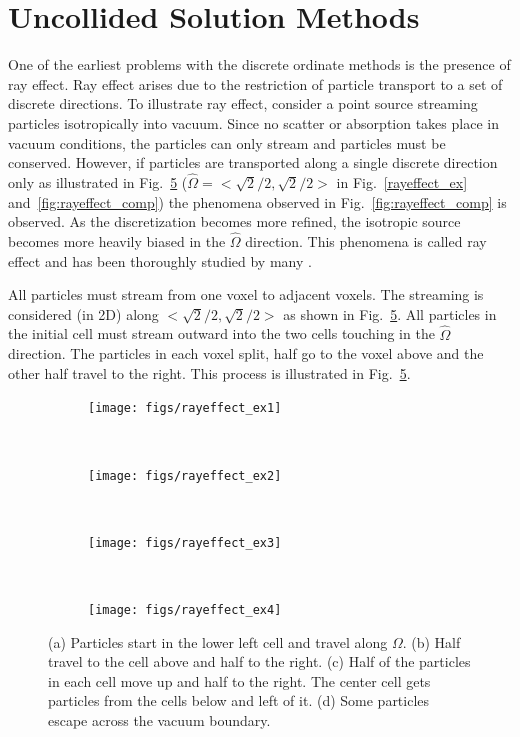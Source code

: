 \section{Uncollided Solution Methods}\label{sec:uncol}
One of the earliest problems with the discrete ordinate methods is the presence of ray effect. Ray effect arises due to the restriction of particle transport to a set of discrete directions. To illustrate ray effect, consider a point source streaming particles isotropically into vacuum. Since no scatter or absorption takes place in vacuum conditions, the particles can only stream and particles must be conserved. However, if particles are transported along a single discrete direction only as illustrated in Fig.~\ref{fig:rayeffect_ex} ($\hat{\Omega} = <\sqrt{2}/2, \sqrt{2}/2>$ in Fig.~\ref{rayeffect_ex} and~\ref{fig:rayeffect_comp}) the phenomena observed in Fig.~\ref{fig:rayeffect_comp} is observed. As the discretization becomes more refined, the isotropic source becomes more heavily biased in the $\hat{\Omega}$ direction. This phenomena is called ray effect and has been thoroughly studied by many \citep{ref:mathewsk} \citep{ref:tencerj}.

All particles must stream from one voxel to adjacent voxels. The streaming is considered (in 2D) along $<\sqrt{2}/2, \sqrt{2}/2>$ as shown in Fig.~\ref{fig:rayeffect_ex}. All particles in the initial cell must stream outward into the two cells touching in the $\hat{\Omega}$ direction. The particles in each voxel split, half go to the voxel above and the other half travel to the right. This process is illustrated in Fig.~\ref{fig:rayeffect_ex}.

\begin{figure}
    \centering
    \begin{subfigure}[b]{0.2\textwidth}
        \texttt{[image: figs/rayeffect\_ex1]}
        \caption{}
        \label{fig:rayeffect_ex1}
    \end{subfigure}
    ~ 
    \begin{subfigure}[b]{0.2\textwidth}
        \texttt{[image: figs/rayeffect\_ex2]}
        \caption{}
        \label{fig:rayeffect_ex2}
    \end{subfigure}
    ~ 
    \begin{subfigure}[b]{0.2\textwidth}
        \texttt{[image: figs/rayeffect\_ex3]}
        \caption{}
        \label{fig:rayeffect_ex3}
    \end{subfigure}
    ~
    \begin{subfigure}[b]{0.2\textwidth}
        \texttt{[image: figs/rayeffect\_ex4]}
        \caption{}
        \label{fig:rayeffect_ex4}
    \end{subfigure}
    \caption{(a) Particles start in the lower left cell and travel along $\Omega$. (b) Half travel to the cell above and half to the right. (c) Half of the particles in each cell move up and half to the right. The center cell gets particles from the cells below and left of it. (d) Some particles escape across the vacuum boundary. }\label{fig:rayeffect_ex}
\end{figure}

